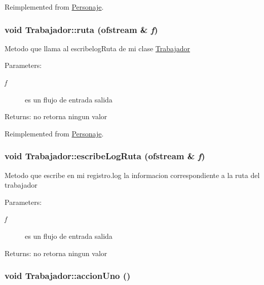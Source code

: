Reimplemented from \hyperlink{classPersonaje_86fe4a1ff708072d98c6be42bbd512ea}{Personaje}.\hypertarget{classTrabajador_6b940e57a18466eafa2dcfe0a60313d3}{
\subsubsection[ruta]{\setlength{\rightskip}{0pt plus 5cm}void Trabajador::ruta (ofstream \& {\em f})}}
\label{classTrabajador_6b940e57a18466eafa2dcfe0a60313d3}


Metodo que llama al escribelogRuta de mi clase \hyperlink{classTrabajador}{Trabajador} \begin{Desc}
\item[Parameters:]
\begin{description}
\item[{\em f}]es un flujo de entrada salida \end{description}
\end{Desc}
\begin{Desc}
\item[Returns:]no retorna ningun valor \end{Desc}


Reimplemented from \hyperlink{classPersonaje_f6dc20013805229005dfb87fc6f273b5}{Personaje}.\hypertarget{classTrabajador_ae7afce778764088e53c23b21876ac96}{
\subsubsection[escribeLogRuta]{\setlength{\rightskip}{0pt plus 5cm}void Trabajador::escribeLogRuta (ofstream \& {\em f})}}
\label{classTrabajador_ae7afce778764088e53c23b21876ac96}


Metodo que escribe en mi registro.log la informacion correspondiente a la ruta del trabajador \begin{Desc}
\item[Parameters:]
\begin{description}
\item[{\em f}]es un flujo de entrada salida \end{description}
\end{Desc}
\begin{Desc}
\item[Returns:]no retorna ningun valor \end{Desc}
\hypertarget{classTrabajador_ea6e8089295c87f0b5a5014895f28526}{
\subsubsection[accionUno]{\setlength{\rightskip}{0pt plus 5cm}void Trabajador::accionUno ()}}
\label{classTrabajador_ea6e8089295c87f0b5a5014895f28526}


